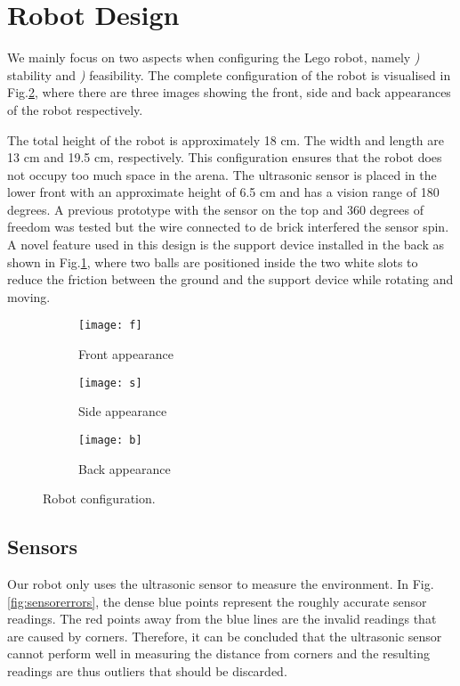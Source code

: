 \section{Robot Design}
We mainly focus on two aspects when configuring the Lego robot, namely {\itshape {})} stability and {\itshape {})} feasibility. The complete configuration of the robot is visualised in Fig.\ref{fig:robotconfig}, where there are three images showing the front, side and back appearances of the robot respectively. 

The total height of the robot is approximately 18 cm. The width and length are 13 cm and 19.5 cm, respectively. This configuration ensures that the robot does not occupy too much space in the arena. The ultrasonic sensor is placed in the lower front with an approximate height of 6.5 cm and has a vision range of 180 degrees. A previous prototype with the sensor on the top and 360 degrees of freedom was tested but the wire connected to de brick interfered the sensor spin. A novel feature used in this design is the support device installed in the back as shown in Fig.\ref{fig:backrobot}, where two balls are positioned inside the two white slots to reduce the friction between the ground and the support device while rotating and moving. 

\begin{figure}[h]
\centering
  \begin{subfigure}{0.25\textwidth}
  \texttt{[image: f]}
  \caption{Front appearance}
  \end{subfigure}
  \begin{subfigure}{0.25\textwidth}
  \texttt{[image: s]}
  \caption{Side appearance}
  \end{subfigure}
  \begin{subfigure}{0.25\textwidth}
  \texttt{[image: b]}
  \caption{Back appearance} \label{fig:backrobot}
  \end{subfigure}
  \caption{Robot configuration.}
  \label{fig:robotconfig}
\end{figure}

\subsection{Sensors}

Our robot only uses the ultrasonic sensor to measure the environment. In Fig.\ref{fig:sensorerrors}, the dense blue points represent the roughly accurate sensor readings. The red points away from the blue lines are the invalid readings that are caused by corners. Therefore, it can be concluded that the ultrasonic sensor cannot perform well in measuring the distance from corners and the resulting readings are thus outliers that should be discarded.


